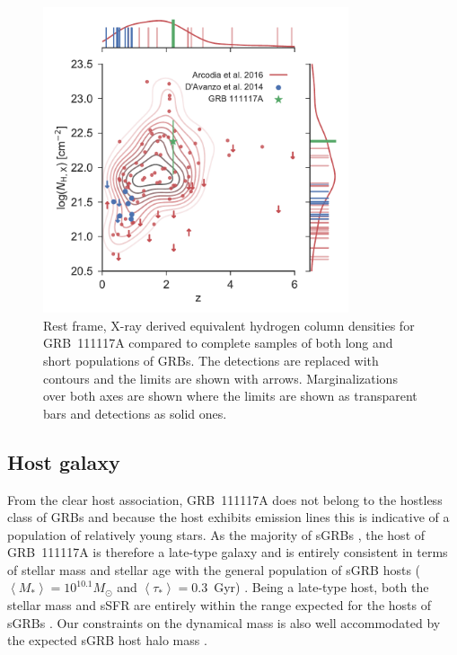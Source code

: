 \documentclass{aa}    %
\begin{document}
\begin{figure}
	\centering
	\includegraphics[width=9cm]{figures/NH_z.pdf}
	\caption{Rest frame, X-ray derived equivalent hydrogen column densities for GRB~111117A compared to complete samples of both long and short populations of GRBs. The detections are replaced with contours and the limits are shown with arrows. Marginalizations over both axes are shown where the limits are shown as transparent bars and detections as solid ones.}
	\label{fig:NH_z}
\end{figure}


\subsection{Host galaxy}

From the clear host association, GRB~111117A does not belong to the hostless
class of GRBs \citep{Berger2010a} and because the host exhibits emission lines
this is indicative of a population of relatively young stars. As the majority of
sGRBs \citep{Fong2013b}, the host of GRB~111117A is therefore a late-type galaxy
and is entirely consistent in terms of stellar mass and stellar age with the
general population of sGRB hosts ($\left\langle M _* \right\rangle = 10^{10.1}
M_{\odot}$ and $\left\langle \tau _* \right\rangle = 0.3 $~Gyr)
\citep{Leibler2010}. Being a late-type host, both the stellar mass and sSFR are
entirely within the range expected for the hosts of sGRBs \citep{Behroozi2014}.
Our constraints on the dynamical mass is also well accommodated by the expected sGRB
host halo mass \citep{Behroozi2014}.
\end{document}
